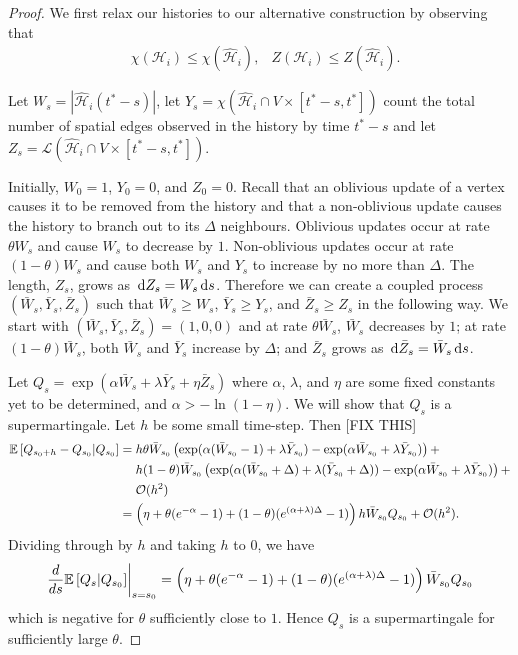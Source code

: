 \begin{proof}
	We first relax our histories to our alternative construction by observing that
	\begin{align}
		&\chi(\mathcal{H}_i) \leq \chi(\hat{\mathcal{H}}_i), &Z(\mathcal{H}_i) \leq Z(\hat{\mathcal{H}}_i).
	\end{align}


	Let $W_s = |\hat{\mathcal{H}}_i (t^* - s)|$, let $Y_s = \chi(\hat{\mathcal{H}}_i \cap V \times [t^* - s, t^*])$ count the total number of spatial edges observed in the history by time $t^* - s$ and let $Z_s = \mathcal{L}(\hat{\mathcal{H}}_i \cap V \times [t^* - s, t^*])$. 

	Initially, $W_0 = 1$, $Y_0 = 0$, and $Z_0 = 0$. Recall that an oblivious update of a vertex causes it to be removed from the history and that a non-oblivious update causes the history to branch out to its $\Delta$ neighbours. Oblivious updates occur at rate $\theta W_s$ and cause $W_s$ to decrease by $1$. Non-oblivious updates occur at rate $(1 - \theta)W_s$ and cause both $W_s$ and $Y_s$ to increase by no more than $\Delta$. The length, $Z_s$, grows as $\, \mathrm{d} Z_s = W_s \, \mathrm{d} s$. Therefore we can create a coupled process $(\bar{W}_s, \bar{Y}_s, \bar{Z}_s)$ such that $\bar{W}_s \geq W_s$, $\bar{Y}_s \geq Y_s$, and $\bar{Z}_s \geq Z_s$ in the following way. We start with $(\bar{W}_s, \bar{Y}_s, \bar{Z}_s) = (1, 0, 0)$ and at rate $\theta \bar{W}_s$, $\bar{W}_s$ decreases by $1$; at rate $(1 - \theta)\bar{W}_s$, both $\bar{W}_s$ and $\bar{Y}_s$ increase by $\Delta$; and $\bar{Z}_s$ grows as $\, \mathrm{d} \bar{Z}_s = \bar{W}_s \, \mathrm{d} s$.

	Let $Q_s = \exp \left(\alpha \bar{W}_s + \lambda \bar{Y}_s + \eta \bar{Z}_s\right)$ where $\alpha$, $\lambda$, and $\eta$ are some fixed constants yet to be determined, and $\alpha > -\ln(1 - \eta)$. We will show that $Q_s$ is a supermartingale. Let $h$ be some small time-step. Then [FIX THIS]
	\begin{align}
		\mathbb{E}\left[Q_{s_0 + h} - Q_{s_0}| Q_{s_0}\right] &= h \theta \bar{W}_{s_0} \left(\exp(\alpha (\bar{W}_{s_0} - 1) + \lambda \bar{Y}_{s_0}) - \exp(\alpha \bar{W}_{s_0} + \lambda \bar{Y}_{s_0})\right) + \\
		&\hphantom{= .} h (1 - \theta) \bar{W}_{s_0} \left( \exp(\alpha (\bar{W}_{s_0} + \Delta) + \lambda (\bar{Y}_{s_0} + \Delta)) - \exp(\alpha \bar{W}_{s_0} + \lambda \bar{Y}_{s_0}) \right) + \notag\\
		&\hphantom{= .} \mathcal{O}(h^2) \notag\\
		&= \left(\eta + \theta (e^{-\alpha} - 1) + (1 - \theta)(e^{(\alpha + \lambda)\Delta} - 1)\right)h \bar{W}_{s_0} Q_{s_0} + \mathcal{O}(h^2).
	\end{align}
	Dividing through by $h$ and taking $h$ to $0$, we have
	\begin{equation}
		\left.\frac{d}{ds} \mathbb{E}\left[Q_{s} | Q_{s_0}\right] \right|_{s = s_0} = \left(\eta + \theta (e^{-\alpha} - 1) + (1 - \theta)(e^{(\alpha + \lambda)\Delta} - 1)\right)\bar{W}_{s_0} Q_{s_0}
	\end{equation}
	which is negative for $\theta$ sufficiently close to $1$. Hence $Q_s$ is a supermartingale for sufficiently large $\theta$.


\end{proof}
